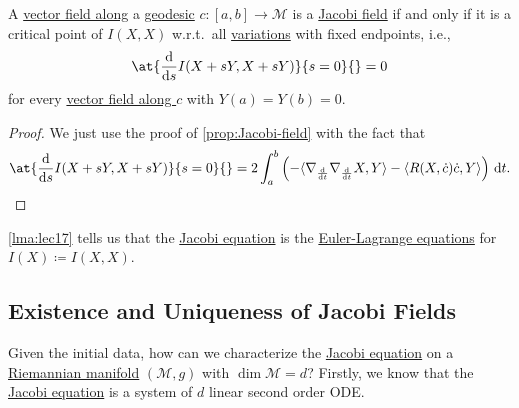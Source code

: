 \begin{lemma}\label{lma:lec17}
	A \hyperref[def:vector-field-along-curve]{vector field along} a \hyperref[def:geodesic]{geodesic} \(c \colon [a, b] \to \mathcal{M} \) is a \hyperref[def:Jacobi-field]{Jacobi field} if and only if it is a critical point of \(I(X, X)\) w.r.t.\ all \hyperref[prev:variation]{variations} with fixed endpoints, i.e.,
	\[
		\at{\frac{\mathrm{d}}{\mathrm{d}s} I(X + s Y, X + sY)}{s=0}{} = 0
	\]
	for every \hyperref[def:vector-field-along-curve]{vector field along \(c\)} with \(Y(a) = Y(b) = 0\).
\end{lemma}
\begin{proof}
	We just use the proof of \autoref{prop:Jacobi-field} with the fact that
	\[
		\at{\frac{\mathrm{d}}{\mathrm{d}s} I(X+sY, X+sY)}{s=0}{}
		= 2 \int_{a}^{b} \left( -\langle \nabla _{\frac{\mathrm{d}}{\mathrm{d}t} } \nabla _{\frac{\mathrm{d}}{\mathrm{d}t} } X, Y \rangle - \langle R(X, \dot{c} ) \dot{c} , Y \rangle \right) \,\mathrm{d}t.
	\]
\end{proof}

\begin{remark}
	\autoref{lma:lec17} tells us that the \hyperref[eq:Jacobi]{Jacobi equation} is the \href{https://en.wikipedia.org/wiki/Euler%E2%80%93Lagrange_equation}{Euler-Lagrange equations} for \(I(X) \coloneqq I(X, X)\).	
\end{remark}

\subsection{Existence and Uniqueness of Jacobi Fields}
Given the initial data, how can we characterize the \hyperref[eq:Jacobi]{Jacobi equation} on a \hyperref[def:Riemannian-manifold]{Riemannian manifold} \((\mathcal{M} , g)\) with \(\dim \mathcal{M} = d\)? Firstly, we know that the \hyperref[eq:Jacobi]{Jacobi equation} is a system of \(d\) linear second order ODE.

